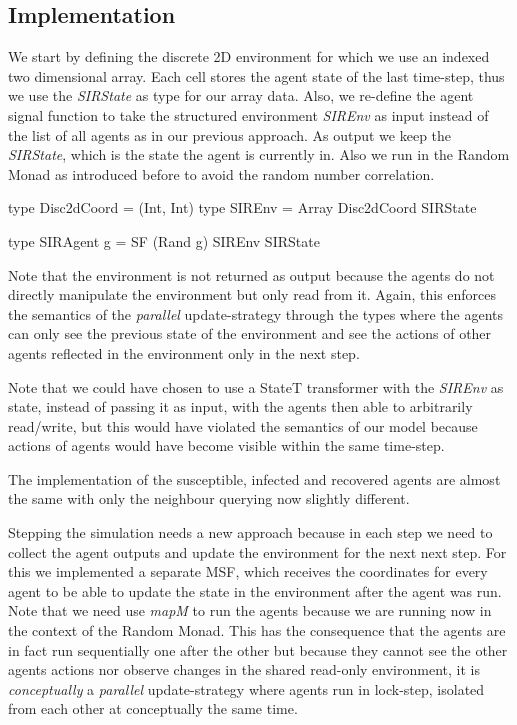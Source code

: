 \subsection{Implementation}
We start by defining the discrete 2D environment for which we use an indexed two dimensional array. Each cell stores the agent state of the last time-step, thus we use the \textit{SIRState} as type for our array data. Also, we re-define the agent signal function to take the structured environment \textit{SIREnv} as input instead of the list of all agents as in our previous approach. As output we keep the \textit{SIRState}, which is the state the agent is currently in. Also we run in the Random Monad as introduced before to avoid the random number correlation. 

\begin{HaskellCode}
type Disc2dCoord = (Int, Int)
type SIREnv      = Array Disc2dCoord SIRState

type SIRAgent g  = SF (Rand g) SIREnv SIRState
\end{HaskellCode}

Note that the environment is not returned as output because the agents do not directly manipulate the environment but only read from it. Again, this enforces the semantics of the \textit{parallel} update-strategy through the types where the agents can only see the previous state of the environment and see the actions of other agents reflected in the environment only in the next step.

Note that we could have chosen to use a StateT transformer with the \textit{SIREnv} as state, instead of passing it as input, with the agents then able to arbitrarily read/write, but this would have violated the semantics of our model because actions of agents would have become visible within the same time-step.

The implementation of the susceptible, infected and recovered agents are almost the same with only the neighbour querying now slightly different. 

Stepping the simulation needs a new approach because in each step we need to collect the agent outputs and update the environment for the next next step. For this we implemented a separate MSF, which receives the coordinates for every agent to be able to update the state in the environment after the agent was run. Note that we need use \textit{mapM} to run the agents because we are running now in the context of the Random Monad. This has the consequence that the agents are in fact run sequentially one after the other but because they cannot see the other agents actions nor observe changes in the shared read-only environment, it is \textit{conceptually} a \textit{parallel} update-strategy where agents run in lock-step, isolated from each other at conceptually the same time.
  
